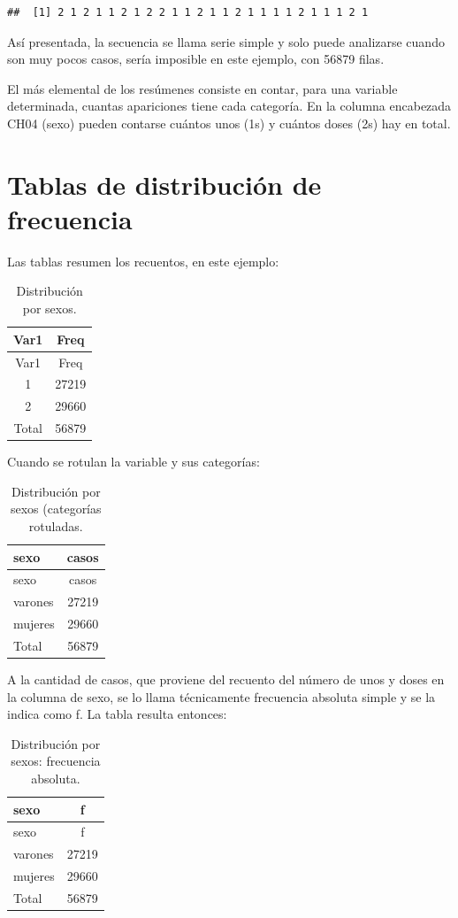 \documentclass[]{book}
\begin{document}
\begin{verbatim}
##  [1] 2 1 2 1 1 2 1 2 2 1 1 2 1 1 2 1 1 1 1 2 1 1 1 2 1
\end{verbatim}

Así presentada, la secuencia se llama serie simple y solo puede analizarse cuando son muy pocos casos, sería imposible en este ejemplo, con 56879 filas.

El más elemental de los resúmenes consiste en contar, para una variable determinada, cuantas apariciones tiene cada categoría. En la columna encabezada CH04 (sexo) pueden contarse cuántos unos (1s) y cuántos doses (2s) hay en total.

\hypertarget{tablas-de-distribucion-de-frecuencia}{%
\section{Tablas de distribución de frecuencia}\label{tablas-de-distribucion-de-frecuencia}}

Las tablas resumen los recuentos, en este ejemplo:

\begin{longtable}[]{@{}cc@{}}
\caption{\label{tab:unnamed-chunk-19}Distribución por sexos.}\tabularnewline
\toprule
Var1 & Freq\tabularnewline
\midrule
\endfirsthead
\toprule
Var1 & Freq\tabularnewline
\midrule
\endhead
1 & 27219\tabularnewline
2 & 29660\tabularnewline
Total & 56879\tabularnewline
\bottomrule
\end{longtable}

Cuando se rotulan la variable y sus categorías:

\begin{longtable}[]{@{}lc@{}}
\caption{\label{tab:unnamed-chunk-20}Distribución por sexos (categorías rotuladas.}\tabularnewline
\toprule
sexo & casos\tabularnewline
\midrule
\endfirsthead
\toprule
sexo & casos\tabularnewline
\midrule
\endhead
varones & 27219\tabularnewline
mujeres & 29660\tabularnewline
Total & 56879\tabularnewline
\bottomrule
\end{longtable}

A la cantidad de casos, que proviene del recuento del número de unos y doses en la columna de sexo, se lo llama técnicamente frecuencia absoluta simple y se la indica como f. La tabla resulta entonces:

\begin{longtable}[]{@{}lc@{}}
\caption{\label{tab:unnamed-chunk-21}Distribución por sexos: frecuencia absoluta.}\tabularnewline
\toprule
sexo & f\tabularnewline
\midrule
\endfirsthead
\toprule
sexo & f\tabularnewline
\midrule
\endhead
varones & 27219\tabularnewline
mujeres & 29660\tabularnewline
Total & 56879\tabularnewline
\bottomrule
\end{longtable}
\end{document}
